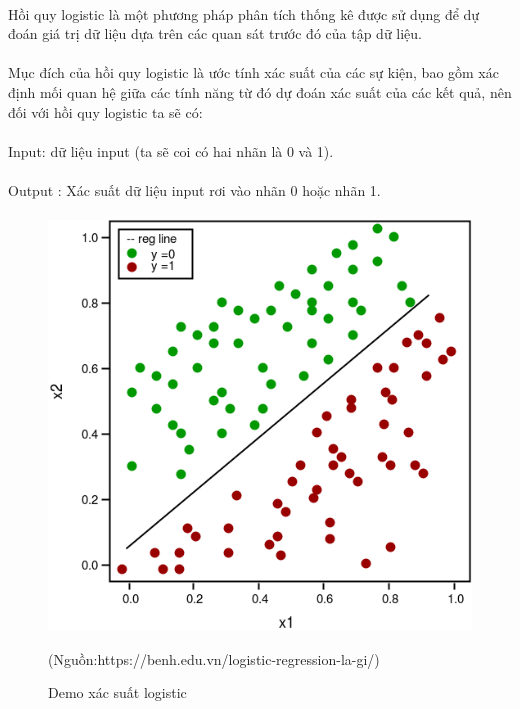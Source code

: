 \documentclass{article}
\begin{document}
\paragraph{}
Hồi quy logistic là một phương pháp phân tích thống kê được sử dụng để dự đoán giá trị dữ liệu dựa trên các quan sát trước đó của tập dữ liệu.
\paragraph{}
Mục đích của hồi quy logistic là ước tính xác suất của các sự kiện, bao gồm xác định mối quan hệ giữa các tính năng từ đó dự đoán xác suất của các kết quả, nên đối với hồi quy logistic ta sẽ có:
\paragraph{}
Input: dữ liệu input (ta sẽ coi có hai nhãn là 0 và 1).
\paragraph{}
Output : Xác suất dữ liệu input rơi vào nhãn 0 hoặc nhãn 1.
\paragraph{}
  \begin{figure}[!h]
	\begin{center}
		\includegraphics[width=\linewidth]{images/logistic.png}
		\caption{\fontsize{14}{20}\selectfont Demo xác suất logistic}
         (Nguồn:https://benh.edu.vn/logistic-regression-la-gi/)
	\end{center}
\end{figure}
\end{document}
